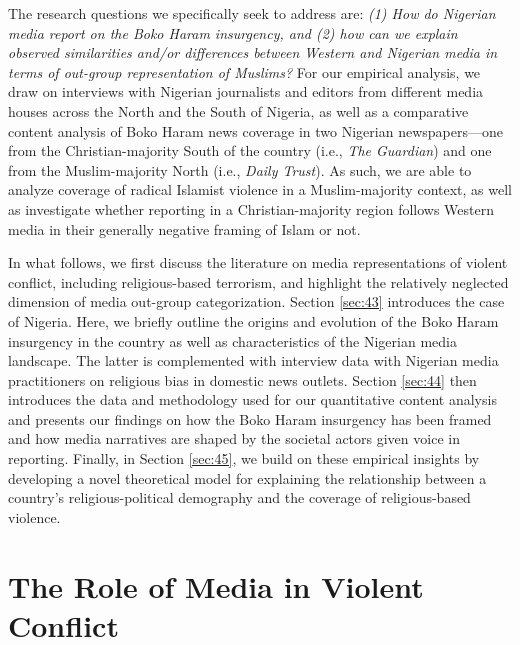 The research questions we specifically seek to address are: \textit{(1) How do Nigerian media report on the Boko Haram insurgency, and (2) how can we explain observed similarities and/or differences between Western and Nigerian media in terms of out-group representation of Muslims?} For our empirical analysis, we draw on interviews with Nigerian journalists and editors from different media houses across the North and the South of Nigeria, as well as a comparative content analysis of Boko Haram news coverage in two Nigerian newspapers---one from the Christian-majority South of the country (i.e., \textit{The Guardian}) and one from the Muslim-majority North (i.e., \textit{Daily Trust}). As such, we are able to analyze coverage of radical Islamist violence in a Muslim-majority context, as well as investigate whether reporting in a Christian-majority region follows Western media in their generally negative framing of Islam or not. %


In what follows, we first discuss the literature on media representations of violent conflict, including religious-based terrorism, and highlight the relatively neglected dimension of media out-group categorization. Section \ref{sec:43} introduces the case of Nigeria. Here, we briefly outline the origins and evolution of the Boko Haram insurgency in the country as well as characteristics of the Nigerian media landscape. The latter is complemented with interview data with Nigerian media practitioners on religious bias in domestic news outlets. Section \ref{sec:44} then introduces the data and methodology used for our quantitative content analysis and presents our findings on how the Boko Haram insurgency has been framed and how media narratives are shaped by the societal actors given voice in reporting. Finally, in Section \ref{sec:45}, we build on these empirical insights by developing a novel theoretical model for explaining the relationship between a country's religious-political demography and the coverage of religious-based violence. 



\section{The Role of Media in Violent Conflict}
\label{sec:42}


